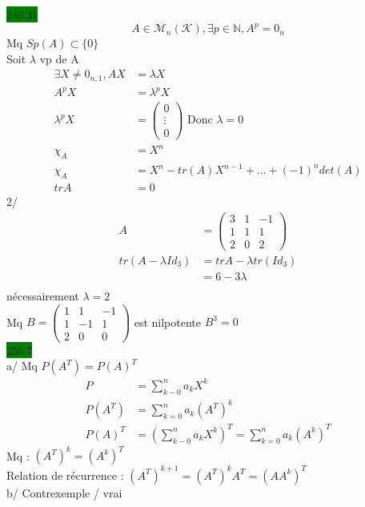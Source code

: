 \documentclass{article}
\begin{document}
\colorbox{green}{240.31}\\
\begin{equation*}
    A \in \mathcal{M}_n(\mathcal{K}), \exists p \in \mathbb{N}, A^p = 0_n
\end{equation*}
Mq \(Sp(A) \subset \{0\}\)\\
Soit \(\lambda\) vp de A 
\begin{align*}
    \exists X \neq 0_{n,1}, AX &= \lambda X\\
    A^p X &= \lambda^p X \\
    \lambda^p X &= \begin{pmatrix}
        0\\ \vdots \\ 0
    \end{pmatrix} \text{ Donc } \lambda = 0\\
    \chi_A &= X^n\\
    \chi_A &= X^n - tr(A)X^{n-1}+...+(-1)^ndet(A)\\
    trA &= 0
\end{align*}
2/ \begin{align*}
    A &= \begin{pmatrix}
        3 & 1 & -1\\ 1& 1& 1\\ 2& 0 & 2
    \end{pmatrix}\\
    tr(A-\lambda Id_3) &= trA - \lambda tr(Id_3)\\
    &= 6 - 3\lambda\\
\end{align*}
nécessairement \(\lambda = 2\)\\
Mq \(B = \begin{pmatrix}
    1 & 1 & -1\\ 1& -1 & 1 \\ 2 & 0 & 0 
\end{pmatrix}\) est nilpotente 
\(B^3 = 0\)\\
\colorbox{green}{250.7}\\
a/ Mq \(P(A^T) = P(A)^T\)
\begin{align*}
    P &= \sum_{k-0}^{n}a_k X^k\\
    P(A^T) &= \sum_{k=0}^{n}a_k(A^T)^k\\
    P(A)^T &= (\sum_{k-0}^{n}a_k X^k)^T = \sum_{k=0}^{n}a_k (A^k)^T
\end{align*}
Mq : \((A^T)^k = (A^k)^T\)\\
Relation de récurrence : \((A^T)^{k+1} = (A^T)^k A^T = (AA^k)^T\)\\
b/ Contrexemple / vrai 
\end{document}
